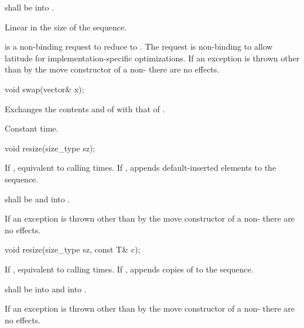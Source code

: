 \begin{itemdescr}
\pnum
\requires {} shall be  into .

\pnum
\complexity Linear in the size of the sequence.

\pnum
\notes {} is a non-binding request to reduce  to . \enternote The request is non-binding to allow latitude for implementation-specific optimizations. \exitnote
If an exception is thrown other than by the move constructor of a non-  there are no effects.
\end{itemdescr}

%
\begin{itemdecl}
void swap(vector& x);
\end{itemdecl}

\begin{itemdescr}
\pnum
\effects
Exchanges the contents and
of
with that of .

\pnum
\complexity
Constant time.
\end{itemdescr}

%
\begin{itemdecl}
void resize(size_type sz);
\end{itemdecl}

\begin{itemdescr}
\pnum
\effects If , equivalent to
calling   times. If ,
appends  default-inserted elements to the
sequence.

\pnum
\requires {} shall be
 and  into .

\pnum
\notes If an exception is thrown other than by the move constructor of a non-
 there are no effects.
\end{itemdescr}

%
\begin{itemdecl}
void resize(size_type sz, const T& c);
\end{itemdecl}

\begin{itemdescr}
\pnum
\effects If , equivalent to
calling   times. If ,
appends  copies of  to the sequence.

\pnum
\requires {} shall be  into  and
 into .

\pnum
\notes If an exception is thrown other than by the move constructor of a
non-  there are no effects.
\end{itemdescr}

